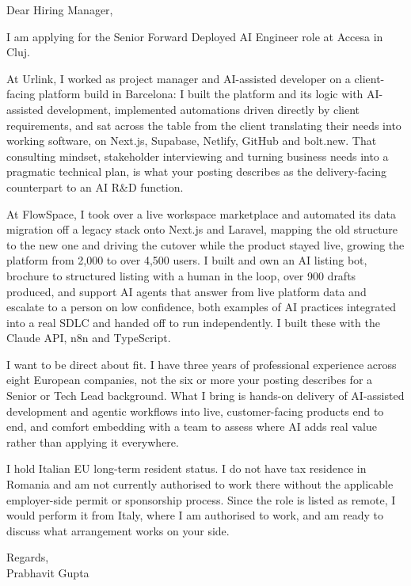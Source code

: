 \documentclass[a4paper,11pt]{article}
\begin{document}
Dear Hiring Manager,

I am applying for the Senior Forward Deployed AI Engineer role at Accesa in Cluj.

At Urlink, I worked as project manager and AI-assisted developer on a client-facing platform build in Barcelona: I built the platform and its logic with AI-assisted development, implemented automations driven directly by client requirements, and sat across the table from the client translating their needs into working software, on Next.js, Supabase, Netlify, GitHub and bolt.new. That consulting mindset, stakeholder interviewing and turning business needs into a pragmatic technical plan, is what your posting describes as the delivery-facing counterpart to an AI R\&D function.

At FlowSpace, I took over a live workspace marketplace and automated its data migration off a legacy stack onto Next.js and Laravel, mapping the old structure to the new one and driving the cutover while the product stayed live, growing the platform from 2,000 to over 4,500 users. I built and own an AI listing bot, brochure to structured listing with a human in the loop, over 900 drafts produced, and support AI agents that answer from live platform data and escalate to a person on low confidence, both examples of AI practices integrated into a real SDLC and handed off to run independently. I built these with the Claude API, n8n and TypeScript.

I want to be direct about fit. I have three years of professional experience across eight European companies, not the six or more your posting describes for a Senior or Tech Lead background. What I bring is hands-on delivery of AI-assisted development and agentic workflows into live, customer-facing products end to end, and comfort embedding with a team to assess where AI adds real value rather than applying it everywhere.

I hold Italian EU long-term resident status. I do not have tax residence in Romania and am not currently authorised to work there without the applicable employer-side permit or sponsorship process. Since the role is listed as remote, I would perform it from Italy, where I am authorised to work, and am ready to discuss what arrangement works on your side.

Regards,\\
Prabhavit Gupta
\end{document}
